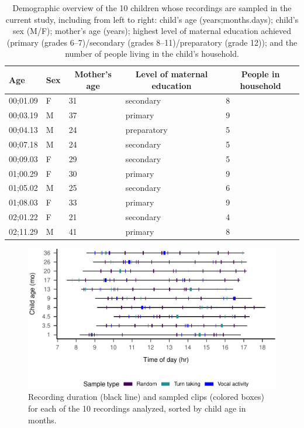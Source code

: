 \documentclass[,man,floatsintext]{apa6}
\begin{document}
\begin{table}[tbp]
\begin{center}
\begin{threeparttable}
\caption{\label{tab:tab1}Demographic overview of the 10 children whose recordings are sampled in the current study, including from left to right: child's age (years;months.days); child's sex (M/F); mother's age (years); highest level of maternal education achieved (primary (grades 6--7)/secondary (grades 8--11)/preparatory (grade 12)); and the number of people living in the child's household.}
\begin{tabular}{lllll}
\toprule
Age & \multicolumn{1}{c}{Sex} & \multicolumn{1}{c}{Mother's age} & \multicolumn{1}{c}{Level of maternal education} & \multicolumn{1}{c}{People in household}\\
\midrule
00;01.09 & F & 31 & secondary & 8\\
00;03.19 & M & 37 & primary & 9\\
00;04.13 & M & 24 & preparatory & 5\\
00;07.18 & M & 24 & secondary & 5\\
00;09.03 & F & 29 & secondary & 5\\
01;00.29 & F & 30 & primary & 9\\
01;05.02 & M & 25 & secondary & 6\\
01;08.03 & F & 33 & primary & 9\\
02;01.22 & F & 21 & secondary & 4\\
02;11.29 & M & 41 & primary & 8\\
\bottomrule
\end{tabular}
\end{threeparttable}
\end{center}
\end{table}

\begin{figure}
\centering
\includegraphics{Yeli-CLE_files/figure-latex/fig1-1.pdf}
\caption{\label{fig:fig1}Recording duration (black line) and sampled clips
(colored boxes) for each of the 10 recordings analyzed, sorted by child
age in months.}
\end{figure}
\end{document}
